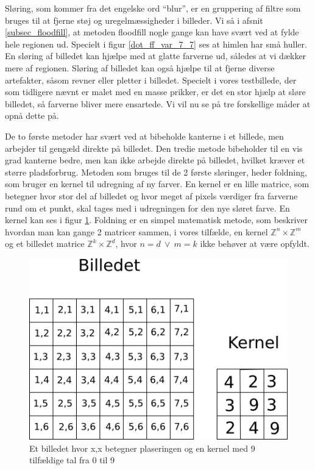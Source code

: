 {
Sløring, som kommer fra det engelske ord ``blur'', er en gruppering af
filtre som bruges til at fjerne støj og uregelmæssigheder i billeder. Vi
så i afsnit \ref{subsec_floodfill}, at metoden floodfill nogle gange kan
have svært ved at fylde hele regionen ud. Specielt i figur
\ref{dot_ff_var_7_7} ses at himlen har små huller. En sløring af
billedet kan hjælpe med at glatte farverne ud, således at vi dækker mere
af regionen. Sløring af billedet kan også hjælpe til at fjerne diverse
artefakter, såsom revner eller pletter i billedet. Specielt i
vores testbillede, der som tidligere nævnt er malet med en masse
prikker, er det en stor hjælp at sløre billedet, så farverne bliver mere
ensartede. Vi vil nu se på tre forskellige måder at opnå dette på.

De to første metoder har svært ved at bibeholde kanterne i et billede,
men arbejder til gengæld direkte på billedet. Den tredie metode
bibeholder til en vis grad kanterne bedre, men kan ikke arbejde direkte
på billedet, hvilket kræver et større pladsforbrug. Metoden som bruges
til de 2 første sløringer, heder foldning, som bruger en kernel til
udregning af ny farver. En kernel er en lille matrice, som betegner hvor
stor del af billedet og hvor meget af pixels værdiger fra farverne rund
om et punkt, skal tages med i udregningen for den nye sløret farve. En
kernel kan ses i figur \ref{Foldning}. Foldning er en simpel matematisk
metode, som beskriver hvordan man kan gange 2 matricer sammen, i vores
tilfælde, en kernel $\mathbb{Z}^{n}\times{} \mathbb{Z}^{m}$ og et
billedet matrice $\mathbb{Z}^{k}\times{} \mathbb{Z}^{d}$, hvor $n = d
~\vee~ m = k$ ikke behøver at være opfyldt.

\begin{figure}[h]
	\begin{center}
		\includegraphics[scale=1,angle=0]{afsnit/vores_implementation/billeder/sloering/convolution}
	\end{center}
	\caption[]{Et billedet hvor x,x betegner plaseringen og en kernel med 9 tilfældige tal fra 0 til 9}
	\label{Foldning}
\end{figure}

}
